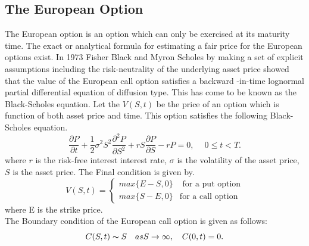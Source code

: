 \documentclass[12pt]{article}
\numberwithin{equation}{subsection} %
\begin{document}
\subsection{The European Option}
 The European option is an option
which can only be exercised at its maturity time. The exact or
analytical formula for estimating a fair price   for the European
options exist. In 1973 Fisher  Black and Myron Scholes by making  a
set of explicit  assumptions including  the risk-neutrality of the
underlying asset price showed that the value of the European  call
option satisfies a backward -in-time lognormal partial differential
equation of diffusion type. This has come to be known as the
Black-Scholes equation\cite{BS73}.
  Let the $V(S,t)$ be the price of an option which is function of both
  asset price and time. This option satisfies the following
  Black-Scholes equation.
  \begin{equation} \label{BSS}
\frac{\partial P}{\partial t}+\frac{1}{2}\sigma^2S^2\frac{\partial^2
P}{\partial S^2} +rS\frac{\partial P}{\partial S}-rP=0, \quad \ 0
\le t < T.
\end{equation}
where $r$ is the risk-free interest interest rate, $\sigma$ is the
volatility of the asset price, $S$ is the asset price. The Final
condition is given by\cite{Wilmot}.
  \begin{equation}\label{fcfc}
V(S,t) = \left\{ \begin{array}{rl}
  max\{E-S,0\}&\mbox{ for a put option} \\
  max\{S-E,0\}&\mbox{for a call option }
       \end{array} \right.
\end{equation}
  where E is the strike price.\\
  The Boundary condition  of the European call option  is given as
  follows:
  \begin{equation}\label{c1}
C(S,t)\thicksim S  \quad
 as S\rightarrow\infty ,\quad C(0,t)=0.
\end{equation}
\end{document}
